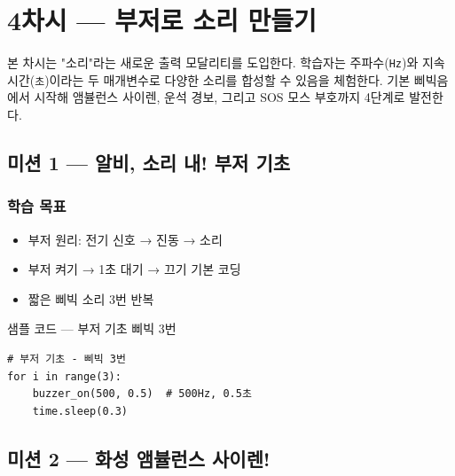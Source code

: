 \section{4차시 --- 부저로 소리 만들기}
\label{sec:ch04}

본 차시는 "소리"라는 새로운 출력 모달리티를 도입한다. 학습자는
주파수(\texttt{Hz})와 지속 시간(\texttt{초})이라는 두 매개변수로
다양한 소리를 합성할 수 있음을 체험한다. 기본 삐빅음에서 시작해 앰뷸런스
사이렌, 운석 경보, 그리고 SOS 모스 부호까지 4단계로 발전한다.

\subsection{미션 1 --- 알비, 소리 내! 부저 기초}
\label{subsec:ch04-m1}

\begin{storybox}
\end{storybox}

\subsubsection*{학습 목표}
\begin{itemize}[leftmargin=1.4em]
  \item 부저 원리: 전기 신호 → 진동 → 소리
  \item 부저 켜기 → 1초 대기 → 끄기 기본 코딩
  \item 짧은 삐빅 소리 3번 반복
\end{itemize}

\begin{labbox}{샘플 코드 --- 부저 기초 삐빅 3번}
\begin{verbatim}
# 부저 기초 - 삐빅 3번
for i in range(3):
    buzzer_on(500, 0.5)  # 500Hz, 0.5초
    time.sleep(0.3)
\end{verbatim}
\end{labbox}

\subsection{미션 2 --- 화성 앰뷸런스 사이렌!}
\label{subsec:ch04-m2}

\begin{storybox}
\end{storybox}

